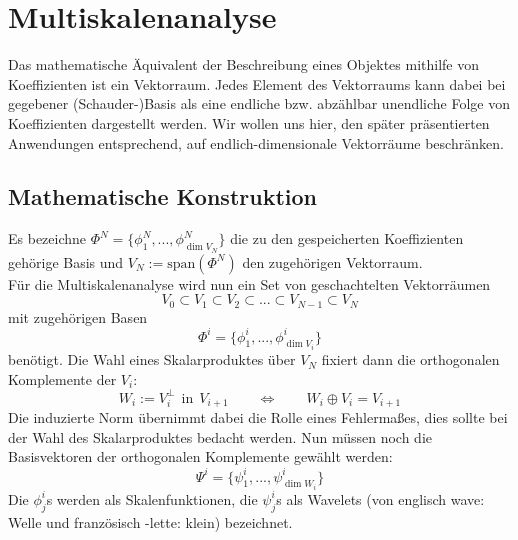 \section{Multiskalenanalyse}
%
Das mathematische Äquivalent der Beschreibung eines Objektes mithilfe von Koeffizienten ist ein Vektorraum. Jedes Element des Vektorraums kann dabei bei gegebener (Schauder-)Basis als eine endliche bzw. abzählbar unendliche Folge von Koeffizienten dargestellt werden. Wir wollen uns hier, den später präsentierten Anwendungen entsprechend, auf endlich-dimensionale Vektorräume beschränken.

\subsection{Mathematische Konstruktion}
Es bezeichne $\Phi^N=\{\phi^N_1, ..., \phi^N_{\dim V_N}\}$ die zu den gespeicherten Koeffizienten gehörige Basis und $V_N:=\mathrm{span}(\Phi^N)$ den zugehörigen Vektorraum.\\
Für die Multiskalenanalyse wird nun ein Set von geschachtelten Vektorräumen\begin{equation*}
V_0\subset V_1\subset V_2\subset ...\subset V_{N-1}\subset V_N
\end{equation*}mit zugehörigen Basen\begin{equation*}
\Phi^i=\{\phi^i_1, ..., \phi^i_{\dim V_i}\}
\end{equation*}benötigt. Die Wahl eines Skalarproduktes über $V_N$ fixiert dann die orthogonalen Komplemente der $V_i$:\begin{equation*}
W_i:=V_i^\perp \mathrm{\ \ in\ \ } V_{i+1}\qquad\Leftrightarrow\qquad W_i\oplus V_i=V_{i+1}
\end{equation*}Die induzierte Norm übernimmt dabei die Rolle eines Fehlermaßes, dies sollte bei der Wahl des Skalarproduktes bedacht werden.
Nun müssen noch die Basisvektoren der orthogonalen Komplemente gewählt werden:\begin{equation*}
\Psi^i=\{\psi^i_1, ..., \psi^i_{\dim W_i}\}
\end{equation*}Die $\phi^i_j$s werden als Skalenfunktionen, die $\psi^i_j$s als Wavelets (von englisch wave: Welle und französisch -lette: klein) bezeichnet.\\

